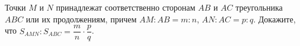 \begin{ex}
	\begin{condition}
		Точки \( M \) и \( N  \) принадлежат соответственно сторонам \( AB  \) и \( AC  \) треугольника \( ABC  \) или их продолжениям, причем \( AM : AB = m : n \), \( AN : AC = p : q \). Докажите, что \( S_{AMN}:S_{ABC}=\dfrac{m}{n}\cdot \dfrac{p}{q}\).
	\end{condition}
\end{ex}
